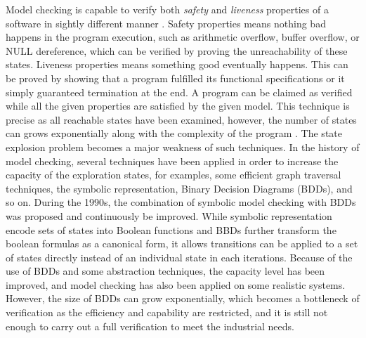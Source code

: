 

Model checking is capable to verify both \textit{safety} and \textit{liveness} properties of a software in sightly different manner \cite{4544862}. Safety properties means nothing bad happens in the program execution, such as arithmetic overflow, buffer overflow, or NULL dereference, which can be verified by proving the unreachability of these states. Liveness properties means something good eventually happens. This can be proved by showing that a program fulfilled its functional specifications or it simply guaranteed termination at the end. A program can be claimed as verified while all the given properties are satisfied by the given model. This technique is precise as all reachable states have been examined, however, the number of states can grows exponentially along with the complexity of the program \cite{Clarke:2001:BMC:510986.510987, biere2003bounded}. The state explosion problem becomes a major weakness of such techniques. In the history of model checking, several techniques have been applied in order to increase the capacity of the exploration states, for examples, some efficient graph traversal techniques, the symbolic representation, Binary Decision Diagrams (BDDs), and so on. During the 1990s, the combination of symbolic model checking with BDDs was proposed and continuously be improved. While symbolic representation encode sets of states into Boolean functions and BBDs further transform the boolean formulas as a canonical form, it allows transitions can be applied to a set of states directly instead of an individual state in each iterations. Because of the use of BDDs and some abstraction techniques, the capacity level has been improved, and model checking has also been applied on some realistic systems. However, the size of BDDs can grow exponentially, which becomes a bottleneck of verification as the efficiency and capability are restricted, and it is still not enough to carry out a full verification to meet the industrial needs.

